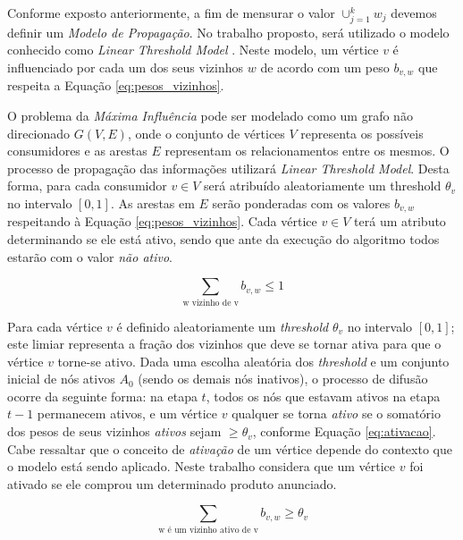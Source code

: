 \documentclass[12pt]{article}
\begin{document}
Conforme exposto anteriormente, a fim de mensurar o valor $\cup_{j=1}^{k} w_{j}$ devemos definir um  \textit{Modelo de Propagação}. No trabalho proposto, será utilizado o modelo conhecido como \textit{Linear Threshold Model} \cite{granovetter1978threshold, schelling2006micromotives}{}. Neste modelo, um vértice $v$ é influenciado por cada um dos seus vizinhos $w$ de acordo com um peso $b_{v,w}$ que respeita a Equação \ref{eq:pesos_vizinhos}{}.

O problema da \textit{Máxima Influência} pode ser modelado como um grafo não direcionado $G(V,E)${}, onde o conjunto de vértices $V$ representa os possíveis consumidores e as arestas $E$ representam os relacionamentos entre os mesmos. O processo de propagação das informações utilizará \textit{Linear Threshold Model}. Desta forma, para cada consumidor $v \in V$ será atribuído aleatoriamente um threshold $\theta_v$ no intervalo $[0, 1]$. As arestas em $E$ serão ponderadas com os valores $b_{v,w}$ respeitando à Equação \ref{eq:pesos_vizinhos}. Cada vértice $v \in V$ terá um atributo determinando se ele está ativo, sendo que ante da execução do algoritmo todos estarão com o valor \textit{não ativo}{}.

\begin{equation} \label{eq:pesos_vizinhos}
\sum\limits_{\textrm{w vizinho de v}}{b_{v,w} \leq 1}
\end{equation}

Para cada vértice $v$ é definido aleatoriamente um \textit{threshold} $\theta_v$ no intervalo $[0, 1]$; este limiar representa a fração dos vizinhos que deve se tornar ativa para que o vértice $v$ torne-se ativo. Dada uma escolha aleatória dos \textit{threshold} e um conjunto inicial de nós ativos $A_{0}$ (sendo os demais nós inativos), o processo de difusão ocorre da seguinte forma: na etapa $t$, todos os nós que estavam ativos na etapa $t-1$ permanecem ativos, e um vértice $v$ qualquer se torna \textit{ativo} se o somatório dos pesos de seus vizinhos \textit{ativos} sejam $\geq \theta_v$, conforme Equação \ref{eq:ativacao}{}. Cabe ressaltar que o conceito de \textit{ativação} de um vértice depende do contexto que o modelo está sendo aplicado. Neste trabalho considera que um vértice $v$ foi ativado se ele comprou um determinado produto anunciado.

\begin{equation} \label{eq:ativacao}
\sum\limits_{\textrm{w é um vizinho ativo de v}}{b_{v,w} \geq \theta_v}
\end{equation}
\end{document}
